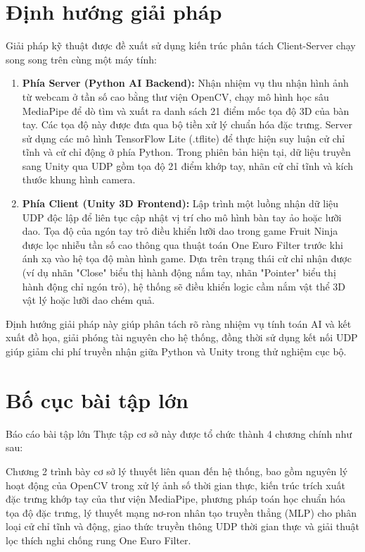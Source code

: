 \documentclass[../BTL.tex]{subfiles}
\begin{document}
\section{Định hướng giải pháp}
\label{section:1.3}
Giải pháp kỹ thuật được đề xuất sử dụng kiến trúc phân tách Client-Server chạy song song trên cùng một máy tính:
\begin{enumerate}
    \item \textbf{Phía Server (Python AI Backend):} Nhận nhiệm vụ thu nhận hình ảnh từ webcam ở tần số cao bằng thư viện OpenCV, chạy mô hình học sâu MediaPipe để dò tìm và xuất ra danh sách 21 điểm mốc tọa độ 3D của bàn tay. Các tọa độ này được đưa qua bộ tiền xử lý chuẩn hóa đặc trưng. Server sử dụng các mô hình TensorFlow Lite (.tflite) để thực hiện suy luận cử chỉ tĩnh và cử chỉ động ở phía Python. Trong phiên bản hiện tại, dữ liệu truyền sang Unity qua UDP gồm tọa độ 21 điểm khớp tay, nhãn cử chỉ tĩnh và kích thước khung hình camera.
    \item \textbf{Phía Client (Unity 3D Frontend):} Lập trình một luồng nhận dữ liệu UDP độc lập để liên tục cập nhật vị trí cho mô hình bàn tay ảo hoặc lưỡi dao. Tọa độ của ngón tay trỏ điều khiển lưỡi dao trong game Fruit Ninja được lọc nhiễu tần số cao thông qua thuật toán One Euro Filter trước khi ánh xạ vào hệ tọa độ màn hình game. Dựa trên trạng thái cử chỉ nhận được (ví dụ nhãn "Close" biểu thị hành động nắm tay, nhãn "Pointer" biểu thị hành động chỉ ngón trỏ), hệ thống sẽ điều khiển logic cầm nắm vật thể 3D vật lý hoặc lưỡi dao chém quả.
\end{enumerate}

Định hướng giải pháp này giúp phân tách rõ ràng nhiệm vụ tính toán AI và kết xuất đồ họa, giải phóng tài nguyên cho hệ thống, đồng thời sử dụng kết nối UDP giúp giảm chi phí truyền nhận giữa Python và Unity trong thử nghiệm cục bộ.

\section{Bố cục bài tập lớn}
\label{section:1.4}
Báo cáo bài tập lớn Thực tập cơ sở này được tổ chức thành 4 chương chính như sau:

Chương 2 trình bày cơ sở lý thuyết liên quan đến hệ thống, bao gồm nguyên lý hoạt động của OpenCV trong xử lý ảnh số thời gian thực, kiến trúc trích xuất đặc trưng khớp tay của thư viện MediaPipe, phương pháp toán học chuẩn hóa tọa độ đặc trưng, lý thuyết mạng nơ-ron nhân tạo truyền thẳng (MLP) cho phân loại cử chỉ tĩnh và động, giao thức truyền thông UDP thời gian thực và giải thuật lọc thích nghi chống rung One Euro Filter.
\end{document}
